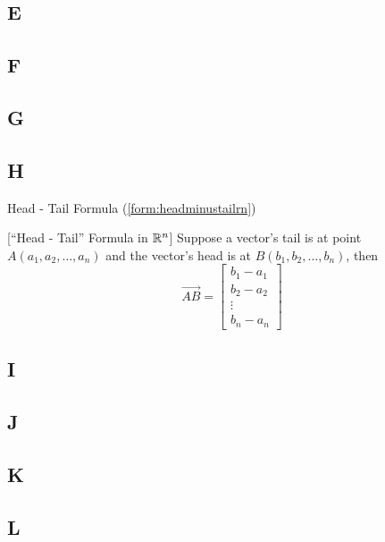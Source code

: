 \documentclass{ximera}
\begin{document}
\subsection{E}

\subsection{F}

\subsection{G}

\subsection{H}
Head - Tail Formula (\ref{form:headminustailrn})
\begin{expandable}
  [``Head - Tail'' Formula in $\mathbb{R}^n$]
Suppose a vector's tail is at point $A(a_1, a_2, \ldots ,a_n)$ and the vector's head is at $B(b_1, b_2, \ldots ,b_n)$, then 
$$\overrightarrow{AB}=\begin{bmatrix}b_1-a_1\\ b_2-a_2\\ \vdots \\b_n-a_n\end{bmatrix}$$


\end{expandable}

\subsection{I}

\subsection{J}

\subsection{K}

\subsection{L}
\end{document}
